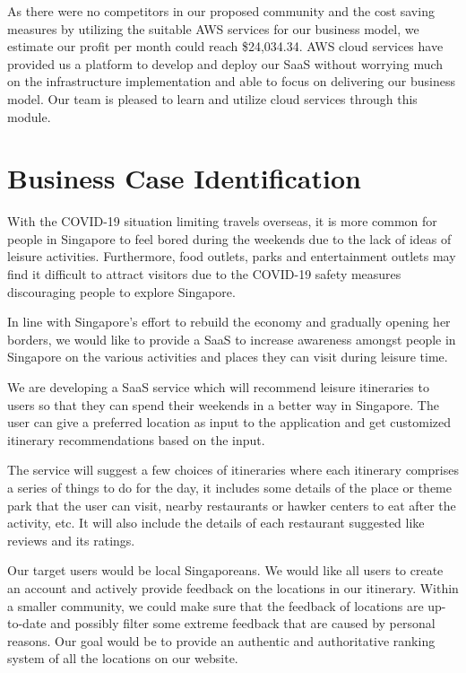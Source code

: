 \documentclass[a4paper]{article}
\begin{document}
As there were no competitors in our proposed community and the cost saving measures by utilizing the suitable AWS services for our business model, we estimate our profit per month could reach \$24,034.34. AWS cloud services have provided us a platform to develop and deploy our SaaS without worrying much on the infrastructure implementation and able to focus on delivering our business model. Our team is pleased to learn and utilize cloud services through this module.


\section{Business Case Identification}

With the COVID-19 situation limiting travels overseas, it is more common for people in Singapore to feel bored during the weekends due to the lack of ideas of leisure activities. Furthermore, food outlets, parks and entertainment outlets may find it difficult to attract visitors due to the COVID-19 safety measures discouraging people to explore Singapore.

In line with Singapore’s effort to rebuild the economy and gradually opening her borders, we would like to provide a SaaS to increase awareness amongst people in Singapore on the various activities and places they can visit during leisure time.

We are developing a SaaS service which will recommend leisure itineraries to users so that they can spend their weekends in a better way in Singapore. The user can give a preferred location as input to the application and get customized itinerary recommendations based on the input.

The service will suggest a few choices of itineraries where each itinerary comprises a series of things to do for the day, it includes some details of the place or theme park that the user can visit, nearby restaurants or hawker centers to eat after the activity, etc. It will also include the details of each restaurant suggested like reviews and its ratings.

Our target users would be local Singaporeans. We would like all users to create an account and actively provide feedback on the locations in our itinerary. Within a smaller community, we could make sure that the feedback of locations are up-to-date and possibly filter some extreme feedback that are caused by personal reasons. Our goal would be to provide an authentic and authoritative ranking system of all the locations on our website. 
\end{document}

